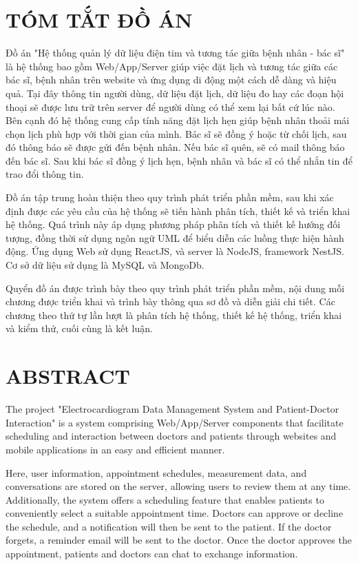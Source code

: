 \section*{TÓM TẮT ĐỒ ÁN}

Đồ án "Hệ thống quản lý dữ liệu điện tim và tương tác giữa bệnh nhân - bác sĩ" là hệ thống bao gồm Web/App/Server 
giúp việc đặt lịch và tương tác giữa các bác sĩ, bệnh nhân trên website và ứng dụng di động một cách dễ dàng và hiệu quả. 
Tại đây thông tin người dùng, dữ liệu đặt lịch, dữ liệu đo hay các đoạn hội thoại sẽ được lưu trữ trên server để người dùng có thể xem lại bất cứ lúc nào.
Bên cạnh đó hệ thống cung cấp tính năng đặt lịch hẹn giúp bệnh nhân thoải mái chọn lịch phù hợp với thời gian của mình.
Bác sĩ sẽ đồng ý hoặc từ chối lịch, sau đó thông báo sẽ được gửi đến bệnh nhân. Nếu bác sĩ quên, sẽ có mail thông báo đến bác sĩ.
Sau khi bác sĩ đồng ý lịch hẹn, bệnh nhân và bác sĩ có thể nhắn tin để trao đổi thông tin.

Đồ án tập trung hoàn thiện theo quy trình phát triển phần mềm, 
sau khi xác định được các yêu cầu của hệ thống sẽ tiến hành phân tích, thiết kế và triển khai hệ thống. 
Quá trình này áp dụng phương pháp phân tích và thiết kế hướng đối tượng, đồng thời sử dụng ngôn ngữ UML để biểu diễn các luồng thực hiện hành động. 
Ứng dụng Web sử dụng ReactJS, và server là NodeJS, framework NestJS. Cơ sở dữ liệu sử dụng là MySQL và MongoDb.

Quyển đồ án được trình bày theo quy trình phát triển phần mềm, nội dung mỗi chương được triển khai và trình bày thông qua sơ đồ và diễn giải chi tiết. 
Các chương theo thứ tự lần lượt là phân tích hệ thống, thiết kế hệ thống, triển khai và kiểm thử, cuối cùng là kết luận.


\newpage
\section*{ABSTRACT}

The project "Electrocardiogram Data Management System and Patient-Doctor Interaction" is a system comprising Web/App/Server components that facilitate scheduling 
and interaction between doctors and patients through websites and mobile applications in an easy and efficient manner.

Here, user information, appointment schedules, measurement data, and conversations are stored on the server, allowing users to review them at any time. 
Additionally, the system offers a scheduling feature that enables patients to conveniently select a suitable appointment time. Doctors can approve or decline the schedule, 
and a notification will then be sent to the patient. If the doctor forgets, a reminder email will be sent to the doctor. 
Once the doctor approves the appointment, patients and doctors can chat to exchange information.


